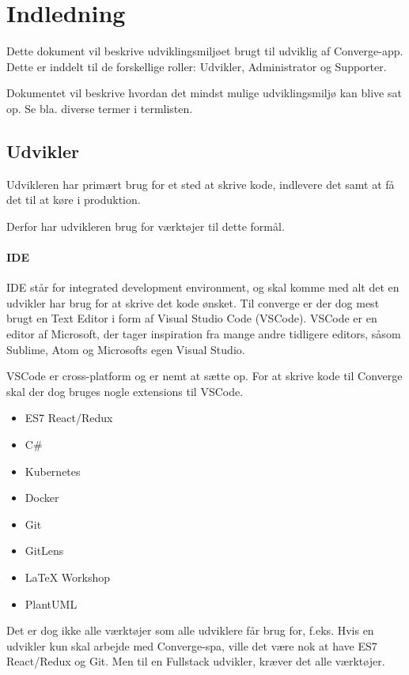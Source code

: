 \chapter{Indledning}

Dette dokument vil beskrive udviklingsmiljøet brugt til udviklig af Converge-app. Dette er inddelt til de forskellige roller: Udvikler, Administrator og Supporter.

Dokumentet vil beskrive hvordan det mindst mulige udviklingsmiljø kan blive sat op. Se bla. diverse termer i termlisten.

\section{Udvikler}

Udvikleren har primært brug for et sted at skrive kode, indlevere det samt at få det til at køre i produktion.

Derfor har udvikleren brug for værktøjer til dette formål.

\subsubsection{IDE}

IDE står for integrated development environment, og skal komme med alt det en udvikler har brug for at skrive det kode ønsket. Til converge er der dog mest brugt en Text Editor i form af Visual Studio Code (VSCode). VSCode er en editor af Microsoft, der tager inspiration fra mange andre tidligere editors, såsom Sublime, Atom og Microsofts egen Visual Studio.

VSCode er cross-platform og er nemt at sætte op. For at skrive kode til Converge skal der dog bruges nogle extensions til VSCode.

\begin{itemize}
    \item ES7 React/Redux
    \item C\#
    \item Kubernetes
    \item Docker
    \item Git
    \item GitLens
    \item LaTeX Workshop
    \item PlantUML
\end{itemize}

Det er dog ikke alle værktøjer som alle udviklere får brug for, f.eks. Hvis en udvikler kun skal arbejde med Converge-spa, ville det være nok at have ES7 React/Redux og Git. Men til en Fullstack udvikler, kræver det alle værktøjer.

